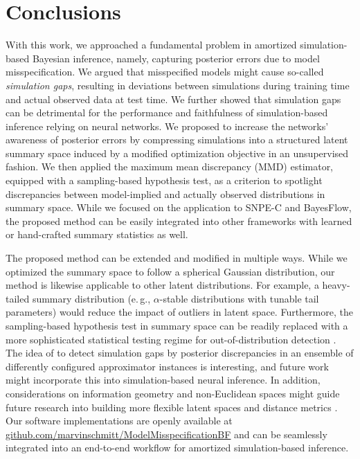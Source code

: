 \documentclass[twoside,11pt]{article}
\newcommand{\0}{\boldsymbol{0}}
\newcommand{\eg}{e.\,g.}
\renewcommand{\cite}[1]{\citep{#1}}
\begin{document}
\section{Conclusions}\label{sec:discussion}

With this work, we approached a fundamental problem in amortized simulation-based Bayesian inference, namely, capturing posterior errors due to model misspecification.
We argued that misspecified models might cause so-called \emph{simulation gaps}, resulting in deviations between simulations during training time and actual observed data at test time.
We further showed that simulation gaps can be detrimental for the performance and faithfulness of simulation-based inference relying on neural networks.
We proposed to increase the networks' awareness of posterior errors by compressing simulations into a structured latent summary space induced by a modified optimization objective in an unsupervised fashion. 
We then applied the maximum mean discrepancy (MMD) estimator, equipped with a sampling-based hypothesis test, as a criterion to spotlight discrepancies between model-implied and actually observed distributions in summary space.
While we focused on the application to SNPE-C and BayesFlow, the proposed method can be easily integrated into other frameworks with learned or hand-crafted summary statistics as well.

The proposed method can be extended and modified in multiple ways.
While we optimized the summary space to follow a spherical Gaussian distribution, our method is likewise applicable to other latent distributions.
For example, a heavy-tailed summary distribution (\eg, $\alpha$-stable distributions with tunable tail parameters) would reduce the impact of outliers in latent space.
Furthermore, the sampling-based hypothesis test in summary space can be readily replaced with a more sophisticated statistical testing regime for out-of-distribution detection \cite{bergamin_model-agnostic_2022}.
The idea of \citet{frazier_model_2020} to detect simulation gaps by posterior discrepancies in an ensemble of differently configured approximator instances is interesting, and future work might incorporate this into simulation-based neural inference.
In addition, considerations on information geometry and non-Euclidean spaces might guide future research into building more flexible latent spaces and distance metrics \cite{info_geo}.
Our software implementations are openly available at \href{https://www.github.com/marvinschmitt/ModelMisspecificationBF}{\textrm{github.com/marvinschmitt/ModelMisspecificationBF}} and can be seamlessly integrated into an end-to-end workflow for amortized simulation-based inference.
\end{document}
